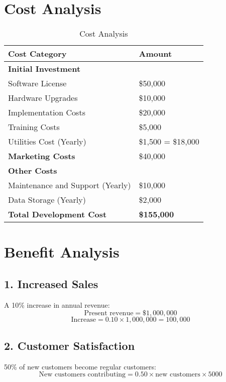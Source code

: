 \documentclass{article}
\begin{document}
\section*{Cost Analysis}

\begin{table}[h!]
\centering
\begin{tabular}{|p{8cm}|p{4cm}|}
\hline
\textbf{Cost Category} & \textbf{Amount} \\
\hline
\textbf{Initial Investment} & \\
\hline
\hspace{10pt} Software License & \$50{,}000 \\
\hline
\hspace{10pt} Hardware Upgrades & \$10{,}000 \\
\hline
\hspace{10pt} Implementation Costs & \$20{,}000 \\
\hline
\hspace{10pt} Training Costs & \$5{,}000 \\
\hline
\hspace{10pt} Utilities Cost (Yearly) & \$1{,}500 \times 12 = \$18{,}000 \\
\hline
\textbf{Marketing Costs} & \$40{,}000 \\
\hline
\textbf{Other Costs} & \\
\hline
\hspace{10pt} Maintenance and Support (Yearly) & \$10{,}000 \\
\hline
\hspace{10pt} Data Storage (Yearly) & \$2{,}000 \\
\hline
\textbf{Total Development Cost} & \textbf{\$155{,}000} \\
\hline
\end{tabular}
\caption{Cost Analysis}
\end{table}

\section*{Benefit Analysis}

\subsection*{1. Increased Sales}
A 10\% increase in annual revenue:
\[
\text{Present revenue} = \$1{,}000{,}000
\]
\[
\text{Increase} = 0.10 \times 1{,}000{,}000 = 100{,}000
\]

\subsection*{2. Customer Satisfaction}
50\% of new customers become regular customers:
\[
\text{New customers contributing} = 0.50 \times \text{new customers} \times 5000
\]
\end{document}
